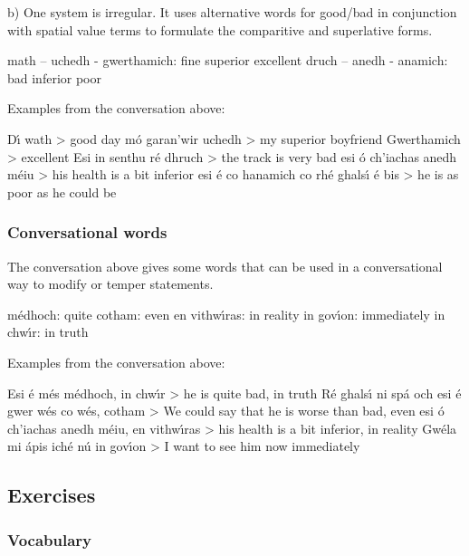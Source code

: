 b) One system is irregular. It uses alternative words for good/bad in conjunction with spatial value terms to formulate the comparitive and superlative forms.

        math –  uchedh   -  gwerthamich: fine       superior     excellent
        druch – anedh -    anamich: bad       inferior    poor

Examples from the conversation above:

D\'{\i} wath > good day
m\'{o} garan’wir uchedh > my superior boyfriend
Gwerthamich > excellent
Esi in senthu r\'{e} dhruch > the track is very bad
esi \'{o} ch’iachas anedh m\'{e}iu > his health is a bit inferior
esi \'{e} co hanamich co rh\'{e} ghals\'{\i} \'{e} bis > he is as poor as he could be

\subsubsection{Conversational words}

The conversation above gives some words that can be used in a conversational way to modify or temper statements.

m\'{e}dhoch: quite
cotham: even
en vithw\'{\i}ras: in reality
in gov\'{\i}on: immediately
in chw\'{\i}r: in truth

Examples from the conversation above:

Esi \'{e} m\'{e}s m\'{e}dhoch, in chw\'{\i}r > he is quite bad, in truth
R\'{e} ghals\'{\i} ni sp\'{a} och esi \'{e} gwer w\'{e}s co w\'{e}s, cotham > We could say that he is worse than bad, even
esi \'{o} ch'iachas anedh m\'{e}iu, en vithw\'{\i}ras > his health is a bit inferior, in reality
Gw\'{e}la mi \'{a}pis ich\'{e} n\'{u} in gov\'{\i}on > I want to see him now immediately

\subsection{Exercises}

\subsubsection{Vocabulary}

